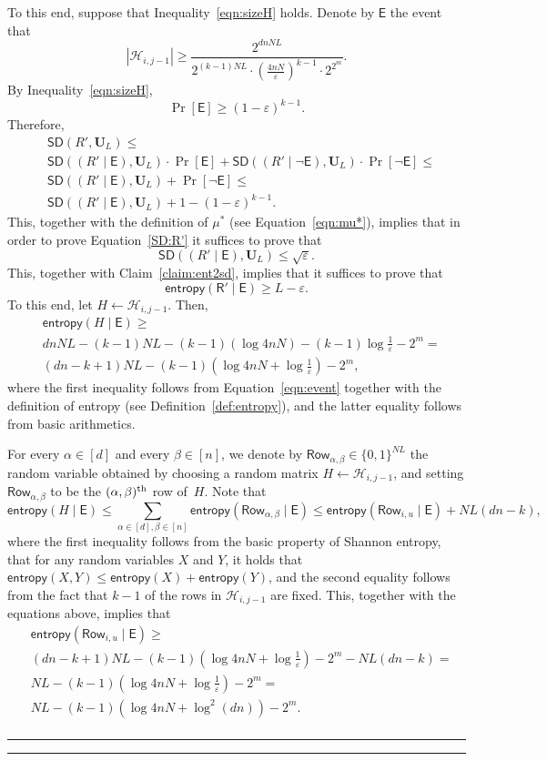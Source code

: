 \documentclass[11pt]{article}
\theoremstyle{plain}
\theoremstyle{definition}
\numberwithin{equation}{section}
\newcommand{\qedsymb}{\hfill{\rule{2mm}{2mm}}}
\renewenvironment{proof}{\begin{trivlist} \item[\hspace{\labelsep}{\bf
\noindent Proof.\/}] }{\qedsymb\end{trivlist}}
\numberwithin{equation}{section} \newcommand{\aka} {also known as\ }
\newcommand{\abs}[1]{\left|#1\right|}
\newcommand{\U}{\mathbf U}
\newcommand{\Hc}{\mathcal H}
\def\epsilon{\varepsilon}
\newcommand{\1}{\mathbf{1}}
\newcommand{\ith}[1]{{#1}\textsuperscript{th}}
\newcommand{\SD}{\mathsf{SD}}
\newcommand{\row}{\textsf{Row}}
\newcommand{\lo}{{\mathsf{R}}}
\newcommand{\ent}{\mathsf{entropy}}
\newcommand{\event}{\mathsf{E}}
\theoremstyle{remark}
\begin{document}
\begin{proof}
\begin{proof}
To this end, suppose that
Inequality~\eqref{eqn:sizeH} holds.
Denote by $\event$ the event that
\begin{equation}\label{eqn:event}
\abs{\Hc_{i,j-1}}\geq\frac{2^{dnN L}}{2^{(k-1)NL}\cdot \left(\frac{4nN}{\epsilon}\right)^{k-1}\cdot 2^{2^m}}.
\end{equation}
By Inequality~\eqref{eqn:sizeH},
$$
\Pr[\event]\geq(1-\epsilon)^{k-1}.
$$
Therefore,
\begin{align*}
&\SD(R',\U_L)\leq\\
&\SD((R'\mid\event),\U_L)\cdot\Pr[\event]+\SD((R'\mid\neg{\event}),\U_L)\cdot\Pr[\neg{\event}]\leq \\
&\SD((R'\mid\event),\U_L)+\Pr[\neg{\event}]\leq\\
&\SD((R'\mid\event),\U_L)+1-(1-\epsilon)^{k-1}.
\end{align*}
This, together with the definition of $\mu^*$ (see Equation~\eqref{eqn:mu*}), implies that in order to prove Equation~\eqref{SD:R'} it suffices to prove that
$$
\SD((R'\mid\event),\U_L)\leq\sqrt{\epsilon}.
$$
This, together with Claim~\ref{claim:ent2sd}, implies that it suffices to prove
that
\begin{equation}\label{eqn:entR}
\ent(\lo'\mid\event)\geq L-\epsilon.
\end{equation}
To this end, let $H\leftarrow\Hc_{i,j-1}$.  Then,
\begin{align*}
&\ent(H\mid \event)\geq \\
&dnNL-(k-1)NL-(k-1)(\log {4nN})-(k-1)\log \frac{1}{\epsilon}-2^m=\\
&(dn-k+1)NL-(k-1)\left(\log {4nN}+\log \frac{1}{\epsilon}\right)-2^m,
\end{align*}
where the first inequality follows from Equation~\eqref{eqn:event} together with the definition of entropy (see Definition~\ref{def:entropy}), and the latter equality follows from basic arithmetics.

For every $\alpha\in[d]$ and every $\beta\in[n]$, we denote by $\row_{\alpha,\beta}\in\{0,1\}^{NL}$ the random variable obtained by choosing a random matrix  $H\leftarrow\Hc_{i,j-1}$, and setting $\row_{\alpha,\beta}$ to be the $\ith{(\alpha,\beta)}$ row of~$H$.
Note that
$$
\ent(H\mid \event)\leq\sum_{\alpha\in[d],\beta\in[n]}\ent(\row_{\alpha,\beta}\mid \event)\leq \ent(\row_{i,u}\mid \event)+NL(dn-k),
$$
where the first inequality follows from the basic property of Shannon entropy,  that for any random variables $X$ and $Y$, it holds that $\ent(X,Y)\leq\ent(X)+\ent(Y)$, and the second equality follows from the fact that $k-1$ of the rows in $\Hc_{i,j-1}$ are fixed.
This, together with the equations above, implies that
\begin{align*}
&\ent(\row_{i,u}\mid \event)\geq\\
& (dn-k+1)NL-(k-1)\left(\log {4nN}+\log \frac{1}{\epsilon}\right)-2^m-NL(dn-k)=\\
& NL-(k-1)\left(\log {4nN}+\log \frac{1}{\epsilon}\right)-2^m=\\
& NL-(k-1)\left(\log {4nN}+\log^2(dn)\right)-2^m.\\
\end{align*}


\end{proof}
\end{proof}
\end{document}
